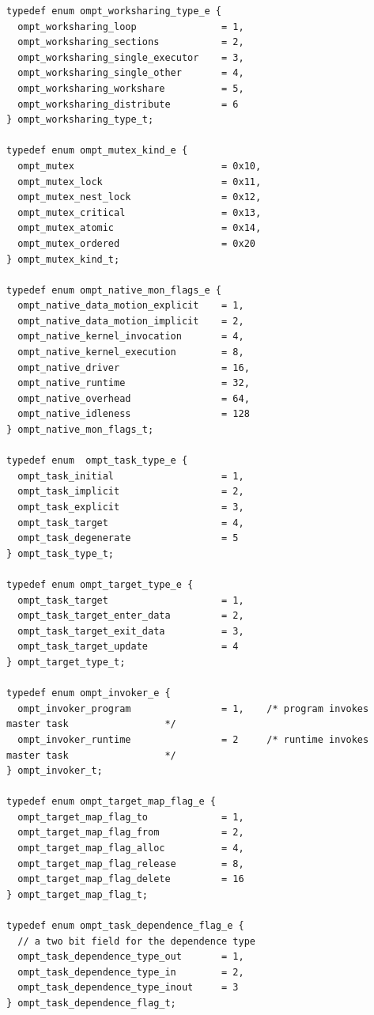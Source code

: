 \documentclass{article}
\begin{document}
\begin{verbatim}
typedef enum ompt_worksharing_type_e {
  ompt_worksharing_loop               = 1, 
  ompt_worksharing_sections           = 2,
  ompt_worksharing_single_executor    = 3,
  ompt_worksharing_single_other       = 4,
  ompt_worksharing_workshare          = 5,
  ompt_worksharing_distribute         = 6
} ompt_worksharing_type_t;

typedef enum ompt_mutex_kind_e {
  ompt_mutex                          = 0x10,
  ompt_mutex_lock                     = 0x11,
  ompt_mutex_nest_lock                = 0x12,
  ompt_mutex_critical                 = 0x13,
  ompt_mutex_atomic                   = 0x14,
  ompt_mutex_ordered                  = 0x20
} ompt_mutex_kind_t;

typedef enum ompt_native_mon_flags_e {
  ompt_native_data_motion_explicit    = 1,
  ompt_native_data_motion_implicit    = 2,
  ompt_native_kernel_invocation       = 4,
  ompt_native_kernel_execution        = 8,
  ompt_native_driver                  = 16,
  ompt_native_runtime                 = 32,
  ompt_native_overhead                = 64,
  ompt_native_idleness                = 128
} ompt_native_mon_flags_t;

typedef enum  ompt_task_type_e {
  ompt_task_initial                   = 1,
  ompt_task_implicit                  = 2,
  ompt_task_explicit                  = 3,
  ompt_task_target                    = 4,
  ompt_task_degenerate                = 5
} ompt_task_type_t;

typedef enum ompt_target_type_e {
  ompt_task_target                    = 1,
  ompt_task_target_enter_data         = 2,
  ompt_task_target_exit_data          = 3,
  ompt_task_target_update             = 4
} ompt_target_type_t;

typedef enum ompt_invoker_e {
  ompt_invoker_program                = 1,    /* program invokes master task                 */
  ompt_invoker_runtime                = 2     /* runtime invokes master task                 */
} ompt_invoker_t;

typedef enum ompt_target_map_flag_e {
  ompt_target_map_flag_to             = 1,
  ompt_target_map_flag_from           = 2,
  ompt_target_map_flag_alloc          = 4,
  ompt_target_map_flag_release        = 8, 
  ompt_target_map_flag_delete         = 16
} ompt_target_map_flag_t;

typedef enum ompt_task_dependence_flag_e {
  // a two bit field for the dependence type
  ompt_task_dependence_type_out       = 1,
  ompt_task_dependence_type_in        = 2,
  ompt_task_dependence_type_inout     = 3
} ompt_task_dependence_flag_t;


\end{verbatim}
\end{document}
